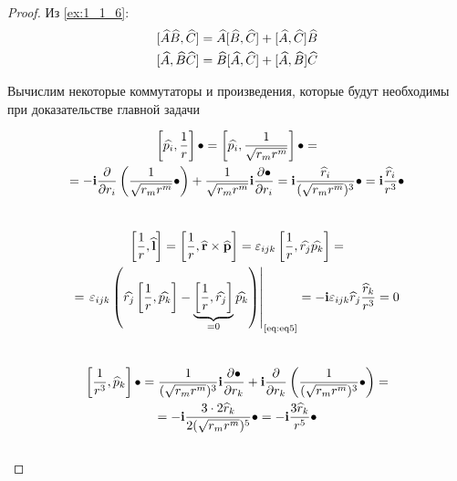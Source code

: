 \begin{proof}
Из \cref{ex:1_1_6}:
\begin{equation}
\label{eq:eq1}
\begin{gathered}
{[\widehat{A} \widehat{B}, \widehat{C}]} = \widehat{A} [\widehat{B},\widehat{C}] + [\widehat{A},\widehat{C}]\widehat{B} \\
{[\widehat{A}, \widehat{B} \widehat{C}]} = \widehat{B}[\widehat{A},\widehat{C}] + [\widehat{A},\widehat{B}]\widehat{C}
\end{gathered}
\end{equation}

Вычислим некоторые коммутаторы и произведения, которые будут необходимы при доказательстве главной задачи

\begin{equation}
\label{eq:eq5}
\begin{gathered}
\left [ {\widehat{p_i}, \frac{1}{r}} \right ] \bullet = \left [ {\widehat{p_i}, \frac{1}{\sqrt{r_m r^m}}} \right ] \bullet = \\ = 
-\mathbf{i} \frac{\partial{}}{\partial{r_i}} \left ( {\frac{1}{\sqrt{r_m r^m}} \bullet} \right ) + \frac{1}{\sqrt{r_m r^m}} \mathbf{i} \frac{\partial{\bullet}}{\partial{r_i}} = \mathbf{i} \frac{\widehat{r}_i}{(\sqrt{r_m r^m})^3} \bullet = \mathbf{i} \frac{\widehat{r}_i}{r^3} \bullet
\end{gathered}
\end{equation}\\

\begin{equation}
\label{eq:eq2}
\begin{gathered}
\left [ {\frac{1}{r}, \widehat{\mathbf{l}}} \right ] = \left [ {\frac{1}{r}, \widehat{\mathbf{r}} \times \widehat{\mathbf{p}}} \right ] = \varepsilon_{ijk} \left [ { \frac{1}{r}, \widehat{r_j}\widehat{p_k} } \right ] = \\ =
\left. \varepsilon_{ijk} \left ( { \widehat{r_j} \left [ { \frac{1}{r}, \widehat{p_k} } \right ] - \underbrace{ \left [ { \frac{1}{r}, \widehat{r_j} } \right ] }_{=0} \widehat{p_k} } \right ) \right|_{\text{\eqref{eq:eq5}}} = 
-\mathbf{i} \varepsilon_{ijk} \widehat{r}_j \frac{\widehat{r}_k}{r^3} = 0
\end{gathered}
\end{equation}\\

\begin{equation}
\label{eq:eq3}
\begin{gathered}
\left [ {\frac{1}{r^3},\widehat{p}_k} \right ] \bullet = \frac{1}{(\sqrt{r_m r^m})^3} \mathbf{i} \frac{\partial{\bullet}}{\partial{r_k}}  + \mathbf{i} \frac{\partial{}}{\partial{r_k}} \left ( {\frac{1}{(\sqrt{r_m r^m})^3} \bullet} \right ) = \\ = -\mathbf{i} \frac{3 \cdot 2 \widehat{r}_k}{2 (\sqrt{r_m r^m})^5} \bullet = -\mathbf{i} \frac{3 \widehat{r}_k}{r^5} \bullet
\end{gathered}
\end{equation}\\


\end{proof}
